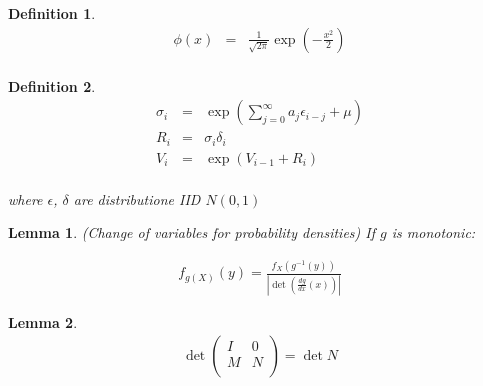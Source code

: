 \documentclass{article}
\newtheorem{definition}{Definition}
\newtheorem{lemma}{Lemma}
\begin{document}
\begin{definition}
\begin{eqnarray*}
  \phi(x) & = & \frac{1}{\sqrt{2\pi}}\exp\left(-\frac{x^2}{2}\right)\\
\end{eqnarray*}
\end{definition}

\begin{definition}
  \begin{eqnarray*}
    \sigma_i & = & \exp\left( \sum_{j=0}^\infty a_j \epsilon_{i-j} + \mu\right)\\
    R_i & = & \sigma_i \delta_i\\
    V_i & = & \exp\left(V_{i-1} + R_i\right)\\
  \end{eqnarray*}

  where $\epsilon$, $\delta$ are distributione IID $N(0,1)$\\
\end{definition}

\begin{lemma}
  {\em (Change of variables for probability densities)}
  If $g$ is monotonic:
  
  \begin{eqnarray*}
    f_{g(X)}(y) = \frac{f_X\left(g^{-1}(y)\right)}{\left|\det\left(\frac{d\!g}{d\!x}(x)\right)\right|}
  \end{eqnarray*}
\end{lemma}

\begin{lemma}
  \begin{eqnarray*}
    \det\left(\begin{array}{cc}
      I & 0\\
      M & N\\
    \end{array}\right) = \det N
  \end{eqnarray*}
\end{lemma}
\end{document}
